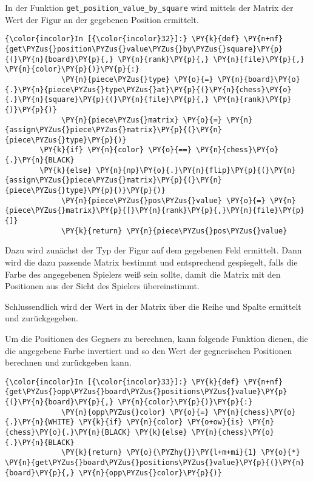 In der Funktion \texttt{get\_position\_value\_by\_square} wird mittels
der Matrix der Wert der Figur an der gegebenen Position ermittelt.

    \begin{Verbatim}[commandchars=\\\{\}]
{\color{incolor}In [{\color{incolor}32}]:} \PY{k}{def} \PY{n+nf}{get\PYZus{}position\PYZus{}value\PYZus{}by\PYZus{}square}\PY{p}{(}\PY{n}{board}\PY{p}{,} \PY{n}{rank}\PY{p}{,} \PY{n}{file}\PY{p}{,} \PY{n}{color}\PY{p}{)}\PY{p}{:}
             \PY{n}{piece\PYZus{}type} \PY{o}{=} \PY{n}{board}\PY{o}{.}\PY{n}{piece\PYZus{}type\PYZus{}at}\PY{p}{(}\PY{n}{chess}\PY{o}{.}\PY{n}{square}\PY{p}{(}\PY{n}{file}\PY{p}{,} \PY{n}{rank}\PY{p}{)}\PY{p}{)}
             \PY{n}{piece\PYZus{}matrix} \PY{o}{=} \PY{n}{assign\PYZus{}piece\PYZus{}matrix}\PY{p}{(}\PY{n}{piece\PYZus{}type}\PY{p}{)} 
		\PY{k}{if} \PY{n}{color} \PY{o}{==} \PY{n}{chess}\PY{o}{.}\PY{n}{BLACK} 
		\PY{k}{else} \PY{n}{np}\PY{o}{.}\PY{n}{flip}\PY{p}{(}\PY{n}{assign\PYZus{}piece\PYZus{}matrix}\PY{p}{(}\PY{n}{piece\PYZus{}type}\PY{p}{)}\PY{p}{)}
             \PY{n}{piece\PYZus{}pos\PYZus{}value} \PY{o}{=} \PY{n}{piece\PYZus{}matrix}\PY{p}{[}\PY{n}{rank}\PY{p}{,}\PY{n}{file}\PY{p}{]}
             \PY{k}{return} \PY{n}{piece\PYZus{}pos\PYZus{}value}
\end{Verbatim}

    Dazu wird zunächst der Typ der Figur auf dem gegebenen Feld ermittelt.
Dann wird die dazu passende Matrix bestimmt und entsprechend gespiegelt,
falls die Farbe des angegebenen Spielers weiß sein sollte, damit die
Matrix mit den Positionen aus der Sicht des Spielers übereinstimmt.

Schlussendlich wird der Wert in der Matrix über die Reihe und Spalte
ermittelt und zurückgegeben.

Um die Positionen des Gegners zu berechnen, kann folgende Funktion
dienen, die die angegebene Farbe invertiert und so den Wert der
gegnerischen Positionen berechnen und zurückgeben kann.

    \begin{Verbatim}[commandchars=\\\{\}]
{\color{incolor}In [{\color{incolor}33}]:} \PY{k}{def} \PY{n+nf}{get\PYZus{}opp\PYZus{}board\PYZus{}positions\PYZus{}value}\PY{p}{(}\PY{n}{board}\PY{p}{,} \PY{n}{color}\PY{p}{)}\PY{p}{:}
             \PY{n}{opp\PYZus{}color} \PY{o}{=} \PY{n}{chess}\PY{o}{.}\PY{n}{WHITE} \PY{k}{if} \PY{n}{color} \PY{o+ow}{is} \PY{n}{chess}\PY{o}{.}\PY{n}{BLACK} \PY{k}{else} \PY{n}{chess}\PY{o}{.}\PY{n}{BLACK}
             \PY{k}{return} \PY{o}{\PYZhy{}}\PY{l+m+mi}{1} \PY{o}{*} \PY{n}{get\PYZus{}board\PYZus{}positions\PYZus{}value}\PY{p}{(}\PY{n}{board}\PY{p}{,} \PY{n}{opp\PYZus{}color}\PY{p}{)}
\end{Verbatim}

